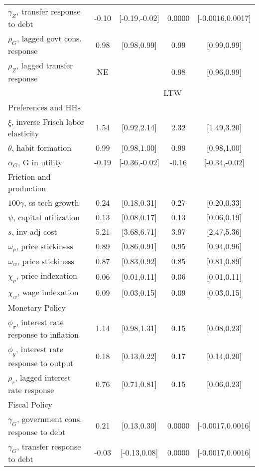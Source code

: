 \documentclass[letterpaper,12pt]{article}%
\begin{document}
\begin{table}[H]
\begin{threeparttable}
\begin{tabular}{l c c  c c}
			\quad $\gamma_Z$, transfer response to debt & -0.10 & [-0.19,-0.02] & 0.0000 & [-0.0016,0.0017]\\
			\quad $\rho_G$, lagged govt cons. response & 0.98 & [0.98,0.99] & 0.99 & [0.99,0.99]\\
			\quad $\rho_Z$, lagged transfer response & NE&  & 0.98 & [0.96,0.99] \\
			& \multicolumn{4}{c}{LTW}  \\
			\cmidrule{2-5} 
			Preferences and HHs&     &   &  &    \\
			\quad $\xi$, inverse Frisch labor elasticity&  1.54 & [0.92,2.14] & 2.32 & [1.49,3.20]  \\
			\quad $\theta$, habit formation & 0.99& [0.98,1.00] & 0.99 & [0.98,1.00] \\
			\quad $\alpha_G$, G in utility & -0.19& [-0.36,-0.02] & -0.16 & [-0.34,-0.02] \\
			Friction and production&     &   &  &    \\
			\quad $100\gamma$, ss tech growth&  0.24 & [0.18,0.31] & 0.27 & [0.20,0.33]  \\
			\quad $\psi$, capital utilization & 0.13& [0.08,0.17] & 0.13 & [0.06,0.19] \\
			\quad $s$, inv adj cost & 5.21& [3.68,6.71] & 3.97 & [2.47,5.36] \\
			\quad $\omega_p$, price stickiness&  0.89 & [0.86,0.91] & 0.95& [0.94,0.96]  \\
			\quad $\omega_w$, price stickiness&  0.87 & [0.83,0.92] & 0.85& [0.81,0.89]  \\
			\quad $\chi_p$, price indexation&  0.06 & [0.01,0.11] & 0.06& [0.01,0.11]  \\
			\quad $\chi_w$, wage indexation&  0.09 & [0.03,0.15] & 0.09& [0.03,0.15]  \\
			Monetary Policy&     &   &  &    \\
			\quad $\phi_\pi$, interest rate response to inflation&  1.14 & [0.98,1.31] & 0.15 & [0.08,0.23]  \\
			\quad $\phi_y$, interest rate response to output & 0.18& [0.13,0.22] & 0.17 & [0.14,0.20] \\
			\quad $\rho_r$, lagged interest rate response & 0.76& [0.71,0.81] & 0.15 & [0.06,0.23] \\ 
			Fiscal Policy&     &   &  &    \\
			\quad $\gamma_G$, government cons. response to debt&  0.21 & [0.13,0.30] & 0.0000 & [-0.0017,0.0016]  \\
			\quad $\gamma_G$, transfer response to debt & -0.03& [-0.13,0.08] & 0.0000& [-0.0017,0.0016] \\

\end{tabular}
\end{threeparttable}
\end{table}
\end{document}
